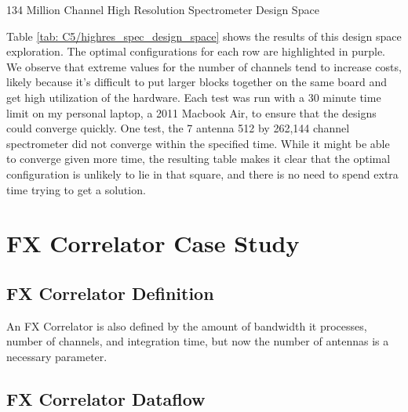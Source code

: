 \begin{table}

\caption{134 Million Channel High Resolution Spectrometer Design Space}
\label{tab: C5/highres_spec_design_space}
\end{table} 

%

Table \ref{tab: C5/highres_spec_design_space} shows the results of this design space exploration. 
The optimal configurations for each row are highlighted in purple.
We observe that extreme values for the number of channels tend to increase costs, likely because it's difficult to put larger blocks together on the same board and get high utilization of the hardware.
Each test was run with a 30 minute time limit on my personal laptop, a 2011 Macbook Air, to ensure that the designs could converge quickly.
One test, the 7 antenna 512 by 262,144 channel spectrometer did not converge within the specified time.
While it might be able to converge given more time, the resulting table makes it clear that the optimal configuration is unlikely to lie in that square, and there is no need to spend extra time trying to get a solution.









\section{FX Correlator Case Study}
\subsection{FX Correlator Definition}
An FX Correlator is also defined by the amount of bandwidth it processes, number of channels, and integration time, but now the number of antennas is a necessary parameter.

\subsection{FX Correlator Dataflow}

